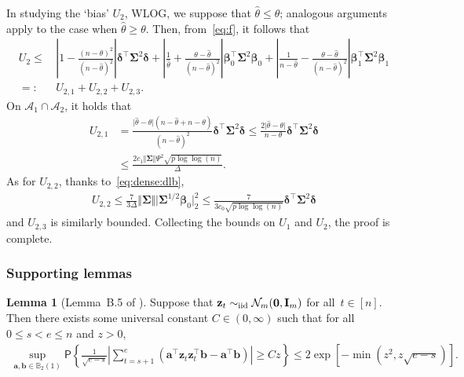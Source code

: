 \documentclass[11pt, a4paper]{article}
\newcommand{\mbf}{\mathbf}
\newcommand{\mc}{\mathcal}
\newcommand{\eps}{\epsilon}
\renewcommand{\l}{\left}
\renewcommand{\r}{\right}
\def\wh{\widehat}
\newcommand{\cp}{\theta}
\newcommand{\p}{\mathsf{P}}
\newcommand{\iid}{\text{\upshape iid}}
\theoremstyle{definition}
\theoremstyle{definition}
\theoremstyle{definition}
\newtheorem{lem}[thm]{Lemma}
\theoremstyle{definition}
\theoremstyle{definition}
\theoremstyle{remark}
\theoremstyle{definition}
\theoremstyle{definition}
\theoremstyle{definition}
\begin{document}
In studying the `bias' $U_2$, WLOG, we suppose that $\wh\cp \le \cp$; analogous arguments apply to the case when $\wh\cp \ge \cp$.
Then, from~\eqref{eq:f}, it follows that
\begin{align*}
U_2 \le & \, \l\vert 1 - \frac{(n - \cp)^2}{(n - \wh\cp)^2} \r\vert \bm\delta^\top \bm\Sigma^2 \bm\delta  + \l\vert \frac{1}{\wh\cp} + \frac{\cp - \wh\cp}{(n - \wh\cp)^2} \r\vert \bm\beta_0^\top \bm\Sigma^2 \bm\beta_0
+ \l\vert \frac{1}{n - \wh\cp} - \frac{\cp - \wh\cp}{(n - \wh\cp)^2} \r\vert \bm\beta_1^\top \bm\Sigma^2 \bm\beta_1 
\\
=: & \, U_{2, 1} + U_{2, 2} + U_{2, 3}.
\end{align*}
On $\mc A_1 \cap \mc A_2$, it holds that
\begin{align*}
U_{2, 1} &= \frac{\vert \wh\cp - \cp \vert (n - \wh\cp + n - \cp)}{(n - \wh\cp)^2} \bm\delta^\top \bm\Sigma^2 \bm\delta
\le \frac{2 \vert \wh\cp - \cp \vert}{n - \cp} \bm\delta^\top \bm\Sigma^2 \bm\delta
\\
&\le \frac{2 c_1 \Vert \bm\Sigma \Vert \Psi^2 \sqrt{p\log\log(n)} }{\Delta}.
\end{align*}
As for $U_{2, 2}$, thanks to~\eqref{eq:dense:dlb},
\begin{align*}
U_{2, 2} \le \frac{7}{3\Delta} \Vert \bm\Sigma \Vert \vert \bm\Sigma^{1/2} \bm\beta_0 \vert_2^2 \le \frac{7}{3c_0 \sqrt{p \log\log(n)}} \bm\delta^\top \bm\Sigma^2 \bm\delta
\end{align*}
and $U_{2, 3}$ is similarly bounded. 
Collecting the bounds on $U_1$ and $U_2$, the proof is complete.



\subsubsection{Supporting lemmas}

\begin{lem}[Lemma~B.5 of \citealp{cho2022high}]
\label{lem:hw}
Suppose that $\mbf z_t \sim_{\iid} \mc N_m(\mbf 0, \mbf I_m)$ for all~$t\in[n]$.
Then there exists some universal constant $C \in (0, \infty)$ %
such that for all $0 \le s < e \le n$ and $z > 0$,
\begin{align*}
\sup_{\mbf a, \mbf b \in \mathbb{B}_2(1)} \p\l\{ \frac{1}{\sqrt{e - s}} \l\vert \sum_{t = s + 1}^e \l( \mbf a^\top \mbf z_t \mbf z_t^\top \mbf b - \mbf a^\top \mbf b \r) \r\vert \ge C z \r\} \le 2 \exp\l[ - \min(z^2,  z \sqrt{e - s}) \r].
\end{align*}
\end{lem}
\end{document}
